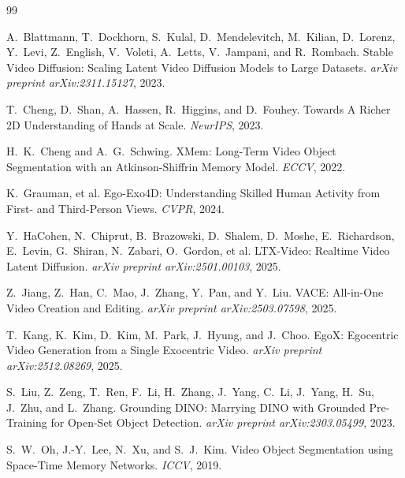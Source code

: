 \documentclass{article}
\begin{document}

\begin{thebibliography}{99}

A.\ Blattmann, T.\ Dockhorn, S.\ Kulal, D.\ Mendelevitch, M.\ Kilian,
D.\ Lorenz, Y.\ Levi, Z.\ English, V.\ Voleti, A.\ Letts, V.\ Jampani, and
R.\ Rombach.
\newblock Stable Video Diffusion: Scaling Latent Video Diffusion Models to
Large Datasets.
\newblock \emph{arXiv preprint arXiv:2311.15127}, 2023.

T.\ Cheng, D.\ Shan, A.\ Hassen, R.\ Higgins, and D.\ Fouhey.
\newblock Towards A Richer 2D Understanding of Hands at Scale.
\newblock \emph{NeurIPS}, 2023.

H.\ K.\ Cheng and A.\ G.\ Schwing.
\newblock XMem: Long-Term Video Object Segmentation with an Atkinson-Shiffrin
Memory Model.
\newblock \emph{ECCV}, 2022.

K.\ Grauman, et al.
\newblock Ego-Exo4D: Understanding Skilled Human Activity from First- and
Third-Person Views.
\newblock \emph{CVPR}, 2024.

Y.\ HaCohen, N.\ Chiprut, B.\ Brazowski, D.\ Shalem, D.\ Moshe, E.\ Richardson,
E.\ Levin, G.\ Shiran, N.\ Zabari, O.\ Gordon, et al.
\newblock LTX-Video: Realtime Video Latent Diffusion.
\newblock \emph{arXiv preprint arXiv:2501.00103}, 2025.

Z.\ Jiang, Z.\ Han, C.\ Mao, J.\ Zhang, Y.\ Pan, and Y.\ Liu.
\newblock VACE: All-in-One Video Creation and Editing.
\newblock \emph{arXiv preprint arXiv:2503.07598}, 2025.

T.\ Kang, K.\ Kim, D.\ Kim, M.\ Park, J.\ Hyung, and J.\ Choo.
\newblock EgoX: Egocentric Video Generation from a Single Exocentric Video.
\newblock \emph{arXiv preprint arXiv:2512.08269}, 2025.

S.\ Liu, Z.\ Zeng, T.\ Ren, F.\ Li, H.\ Zhang, J.\ Yang, C.\ Li, J.\ Yang,
H.\ Su, J.\ Zhu, and L.\ Zhang.
\newblock Grounding DINO: Marrying DINO with Grounded Pre-Training for
Open-Set Object Detection.
\newblock \emph{arXiv preprint arXiv:2303.05499}, 2023.

S.\ W.\ Oh, J.-Y.\ Lee, N.\ Xu, and S.\ J.\ Kim.
\newblock Video Object Segmentation using Space-Time Memory Networks.
\newblock \emph{ICCV}, 2019.


\end{thebibliography}
\end{document}
